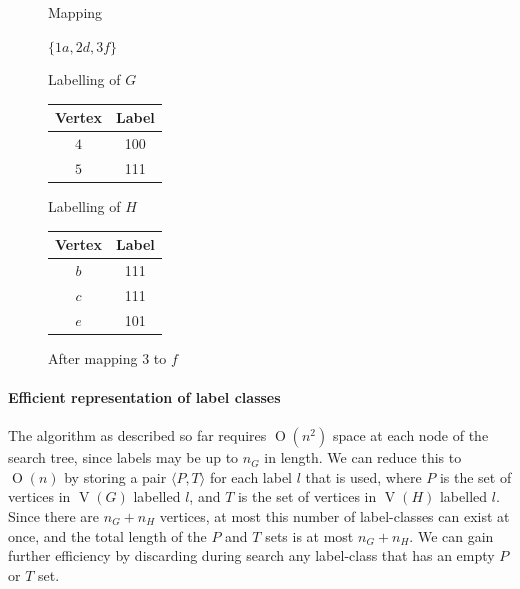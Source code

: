\documentclass[letterpaper]{article}
\DeclareMathOperator{\V}{V}
\newcommand{\BigO}[1]{\ensuremath{\operatorname{O}\left(#1\right)}}
\begin{document}
\begin{figure}[ht]
\centering
\begin{minipage}[t]{0.2\linewidth}
    Mapping

    \bigskip

    $\{1a, 2d, 3f\}$
\end{minipage}
\quad
\begin{minipage}[t]{0.3\linewidth}
    Labelling of $G$
    \begin{tabular}[t]{cc}
    \hline
        Vertex & Label\\
    \hline
        $4$ & 100 \\
        $5$ & 111 \\
    \hline
    \end{tabular}
\end{minipage}
\quad
\begin{minipage}[t]{0.3\linewidth}
    Labelling of $H$
    \begin{tabular}[t]{cc}
    \hline
        Vertex & Label\\
    \hline
        $b$ & 111 \\
        $c$ & 111 \\
        $e$ & 101 \\
    \hline
    \end{tabular}
\end{minipage}
\caption{After mapping $3$ to $f$}
\label{fig:alg4}
\end{figure}


\paragraph{Efficient representation of label classes} The algorithm as
described so far requires $\BigO{n^2}$ space at each node of the search tree,
since labels may be up to $n_G$ in length. We can reduce this to $\BigO{n}$
by storing a pair $\langle P,T \rangle$ for each label $l$ that is used, where $P$
is the set of vertices in $\V(G)$ labelled $l$, and $T$ is the set of vertices
in $\V(H)$ labelled $l$. Since there are $n_G + n_H$ vertices, at most this number
of label-classes can exist at once, and the total length of the $P$ and $T$ sets
is at most $n_G + n_H$. We can gain further efficiency by discarding during search
any label-class that has an empty $P$ or $T$ set.
\end{document}
